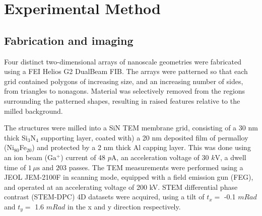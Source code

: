 \section{Experimental Method}

\subsection{Fabrication and imaging}

Four distinct two-dimensional arrays of nanoscale geometries were fabricated using a FEI Helios G2 DualBeam FIB. The arrays were patterned so that each grid contained polygons of increasing size, and an increasing number of sides, from triangles to nonagons.
Material was selectively removed from the regions surrounding the patterned shapes, resulting in raised features relative to the milled background.

The structures were milled into a SiN TEM membrane grid, consisting of a 30 nm thick Si$_{3}$N$_{4}$ supporting layer, coated with) a 20 nm deposited film of permalloy (Ni$_{80}$Fe$_{20}$) and protected by a 2 nm thick Al capping layer. This was done using an ion beam ($ \mathrm{Ga^{+}} $) current of 48 $p$A, an acceleration voltage of 30 $k$V, a dwell time of $1\,\mu\text{s}$ and $203$ passes.
The TEM measurements were performed using a JEOL JEM-2100F in scanning mode, equipped with a field emission gun (FEG), and operated at an accelerating voltage of 200 kV. STEM differential phase contrast (STEM-DPC) 4D datasets were acquired, using a tilt of $t_x =$ -0.1 $mRad$  and $t_y =$ 1.6 $mRad$ in the x and y direction respectively.

